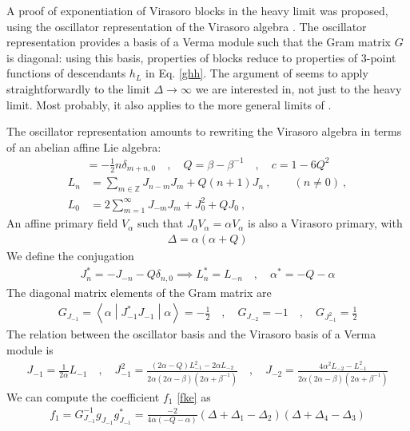 \documentclass[12pt,a4paper]{article}
\begin{document}
A proof of exponentiation of Virasoro blocks in the heavy limit was proposed, using the oscillator representation of the Virasoro algebra \cite{bdk19}. The oscillator representation provides a basis of a Verma module such that the Gram matrix $G$ is diagonal: using this basis, properties of blocks reduce to properties of 3-point functions of descendants $h_L$ in Eq. \eqref{ghh}. The argument of \cite{bdk19} seems to apply straightforwardly to the limit $\Delta\to\infty$ we are interested in, not just to the heavy limit. Most probably, it also applies to the more general limits of \cite{al24}. 

The oscillator representation amounts to rewriting the Virasoro algebra in terms of an abelian affine Lie algebra: 
\begin{align}
 [J_m,J_n] = -\frac12 n\delta_{m+n,0}\quad , \quad Q = \beta -\beta^{-1} \quad , \quad c = 1-6Q^2
\end{align}
\begin{align}
 L_n &= \sum_{m\in{\mathbb{Z}}} J_{n-m}J_m + Q(n+1)J_n\ , \qquad (n\neq 0)\ ,
\label{lnj}
\\
L_0 &=2\sum_{m=1}^\infty J_{-m}J_m +J_0^2+QJ_0 \ ,
\label{lzj}
\end{align}
An affine primary field $V_\alpha$ such that $J_0V_\alpha = \alpha V_\alpha$ is also a Virasoro primary, with 
\begin{align}
 \Delta = \alpha(\alpha + Q)
\end{align}
We define the conjugation 
\begin{align}
 J_n^* = -J_{-n}-Q\delta_{n,0} \implies L_n^* = L_{-n} \quad , \quad \alpha^*=-Q-\alpha
\end{align}
The diagonal matrix elements of the Gram matrix are 
\begin{align}
 G_{J_{-1}} = \left<\alpha\middle|J_{-1}^*J_{-1}\middle|\alpha\right>= -\frac12  \quad , \quad G_{J_{-2}} = -1 \quad ,\quad G_{J_{-1}^2} = \frac12
\end{align}
The relation between the oscillator basis and the Virasoro basis of a Verma module is 
\begin{align}
 J_{-1} = \frac{1}{2\alpha} L_{-1} \quad , \quad J_{-1}^2 = \frac{(2\alpha-Q)L_{-1}^2 -2\alpha L_{-2}}{2\alpha(2\alpha-\beta)(2\alpha+\beta^{-1})} \quad , \quad J_{-2} = \frac{4\alpha^2 L_{-2}-L_{-1}^2}{2\alpha(2\alpha-\beta)(2\alpha+\beta^{-1})}
 \label{jl}
\end{align}
We can compute the coefficient $f_1$ \eqref{fke} as 
\begin{align}
 f_1 = G_{J_{-1}}^{-1} g_{J_{-1}} g_{J_{-1}}^* = \frac{-2}{4\alpha(-Q-\alpha)}(\Delta+\Delta_1-\Delta_2)(\Delta+\Delta_4-\Delta_3)
\end{align}
\end{document}
